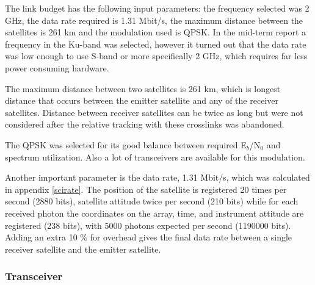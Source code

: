 The link budget has the following input parameters: the frequency selected was 2 GHz, the data rate required is 1.31 Mbit/s, the maximum distance between the satellites is 261 km and the modulation used is \acs{QPSK}.
In the mid-term report a frequency in the Ku-band was selected, however it turned out that the data rate was low enough to use S-band or more specifically 2 GHz, which requires far less power consuming hardware.

The maximum distance between two satellites is 261 km, which is longest distance that occurs between the emitter satellite and any of the receiver satellites. Distance between receiver satellites can be twice as long but were not considered after the relative tracking with these crosslinks was abandoned.

The QPSK was selected for its good balance between required E$_{b}$/N$_{0}$ and spectrum utilization. Also a lot of transceivers are available for this modulation.

Another important parameter is the data rate, 1.31 Mbit/s, which was calculated in appendix \ref{scirate}. The position of the satellite is registered 20 times per second (2880 bits), satellite attitude twice per second (210 bits) while for each received photon the coordinates on the array, time, and instrument attitude are registered (238 bits), with 5000 photons expected per second (1190000 bits). Adding an extra 10 \% for overhead gives the final data rate between a single receiver satellite and the emitter satellite.

\subsubsection{Transceiver}

